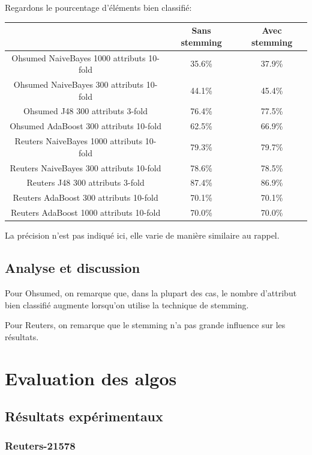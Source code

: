 \documentclass[a4paper,10pt]{article}
\begin{document}
Regardons le pourcentage d'éléments bien classifié:
\begin{center}
\begin{tabular}{ |c|c|c| } 
 \hline
  & Sans stemming & Avec stemming \\ 
 \hline
 Ohsumed NaiveBayes 1000 attributs 10-fold  & 35.6\% & 37.9\% \\ 
 Ohsumed NaiveBayes 300 attributs 10-fold  & 44.1\% & 45.4\% \\ 
 Ohsumed J48 300 attributs 3-fold & 76.4\% & 77.5\% \\ 
 Ohsumed AdaBoost 300 attributs 10-fold & 62.5\% & 66.9\% \\
 \hline
 Reuters NaiveBayes 1000 attributs 10-fold & 79.3\% & 79.7\% \\
 Reuters NaiveBayes 300 attributs 10-fold  & 78.6\% & 78.5\% \\ 
 Reuters J48 300 attributs 3-fold & 87.4\% & 86.9\% \\ 
 Reuters AdaBoost 300 attributs 10-fold & 70.1\% & 70.1\% \\ 
 Reuters AdaBoost 1000 attributs 10-fold & 70.0\% & 70.0\% \\ 
 \hline
\end{tabular}
\end{center}
La précision n'est pas indiqué ici, elle varie de manière similaire au rappel.

\subsection{Analyse et discussion}
Pour Ohsumed, on remarque que, dans la plupart des cas, le nombre d'attribut bien classifié augmente lorsqu'on utilise la technique de stemming. 

Pour Reuters, on remarque que le stemming n'a pas grande influence sur les résultats.

\section{Evaluation des algos}

\subsection{Résultats expérimentaux}

\subsubsection{Reuters-21578}
\end{document}
